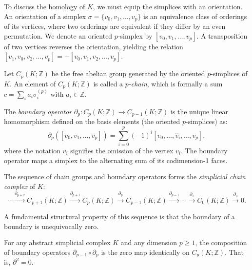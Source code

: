To discuss the homology of $K$, we must equip the simplices with an orientation. An orientation of a simplex $\sigma = \{v_0, v_1, \dots, v_p\}$ is an equivalence class of orderings of its vertices, where two orderings are equivalent if they differ by an even permutation. We denote an oriented $p$-simplex by $[v_0, v_1, \dots, v_p]$. A transposition of two vertices reverses the orientation, yielding the relation $[v_1, v_0, v_2, \dots, v_p] = -[v_0, v_1, v_2, \dots, v_p]$.

Let $C_p(K; \mathbb{Z})$ be the free abelian group generated by the oriented $p$-simplices of $K$. An element of $C_p(K; \mathbb{Z})$ is called a \emph{$p$-chain}, which is formally a sum $c = \sum_i a_i \sigma_i^{(p)}$ with $a_i \in \mathbb{Z}$.

The \emph{boundary operator} $\partial_p : C_p(K; \mathbb{Z}) \to C_{p-1}(K; \mathbb{Z})$ is the unique linear homomorphism defined on the basis elements (the oriented $p$-simplices) as:
\[ \partial_p([v_0, v_1, \dots, v_p]) = \sum_{i=0}^p (-1)^i [v_0, \dots, \hat{v}_i, \dots, v_p], \]
where the notation $\hat{v}_i$ signifies the omission of the vertex $v_i$. The boundary operator maps a simplex to the alternating sum of its codimension-1 faces.

The sequence of chain groups and boundary operators forms the \emph{simplicial chain complex} of $K$:
\[ \cdots \xrightarrow{\partial_{p+2}} C_{p+1}(K; \mathbb{Z}) \xrightarrow{\partial_{p+1}} C_p(K; \mathbb{Z}) \xrightarrow{\partial_p} C_{p-1}(K; \mathbb{Z}) \xrightarrow{\partial_{p-1}} \cdots \xrightarrow{\partial_1} C_0(K; \mathbb{Z}) \xrightarrow{\partial_0} 0. \]

A fundamental structural property of this sequence is that the boundary of a boundary is unequivocally zero.

\begin{lemma}
\label{lem:nilpotency}
For any abstract simplicial complex $K$ and any dimension $p \ge 1$, the composition of boundary operators $\partial_{p-1} \circ \partial_p$ is the zero map identically on $C_p(K; \mathbb{Z})$. That is, $\partial^2 = 0$.
\end{lemma}

